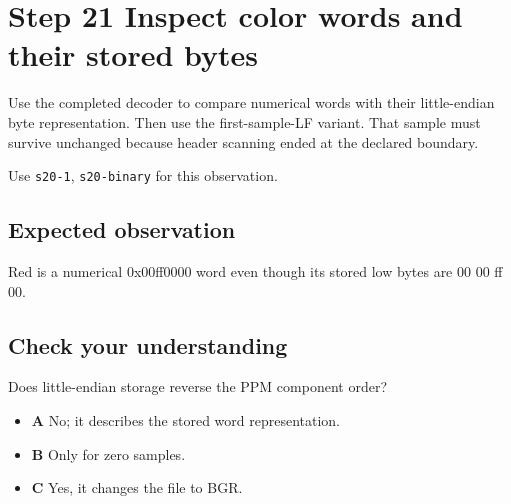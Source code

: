 \section{Step 21 Inspect color words and their stored bytes}\label{ppm-s21}

Use the completed decoder to compare numerical words with their little-endian byte representation. Then use the first-sample-LF variant. That sample must survive unchanged because header scanning ended at the declared boundary.

Use \texttt{s20-1}, \texttt{s20-binary} for this observation.

\subsection{Expected observation}
Red is a numerical 0x00ff0000 word even though its stored low bytes are 00 00 ff 00.

\subsection{Check your understanding}
Does little-endian storage reverse the PPM component order?

\begin{itemize}
\item \textbf{A} No; it describes the stored word representation.
\item \textbf{B} Only for zero samples.
\item \textbf{C} Yes, it changes the file to BGR.
\end{itemize}
